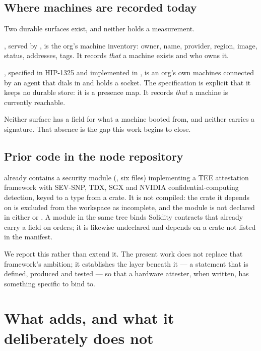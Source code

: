 \documentclass[11pt]{article}
\theoremstyle{definition}
\begin{document}
\subsection{Where machines are recorded today}

Two durable surfaces exist, and neither holds a measurement.

, served by , is the org's machine
inventory: owner, name, provider, region, image, status, addresses, tags. It
records \emph{that} a machine exists and who owns it.

, specified in HIP-1325 and implemented in ,
is an org's own machines connected by an agent that dials in and holds a socket.
The specification is explicit that it keeps no durable store: it is a presence
map. It records \emph{that} a machine is currently reachable.

Neither surface has a field for what a machine booted from, and neither carries a
signature. That absence is the gap this work begins to close.

\subsection{Prior code in the node repository}

 already contains a security module
(, six files) implementing a TEE
attestation framework with SEV-SNP, TDX, SGX and NVIDIA confidential-computing
detection, keyed to a  type from a  crate. It
is not compiled: the crate it depends on is excluded from the workspace as
incomplete, and the module is not declared in either  or
. A  module in the same tree binds Solidity
contracts that already carry a  field on orders; it is
likewise undeclared and depends on a crate not listed in the manifest.

We report this rather than extend it. The present work does not replace that
framework's ambition; it establishes the layer beneath it --- a statement that is
defined, produced and tested --- so that a hardware attester, when written, has
something specific to bind to.

\section{What  adds, and what it deliberately does not}
\end{document}
